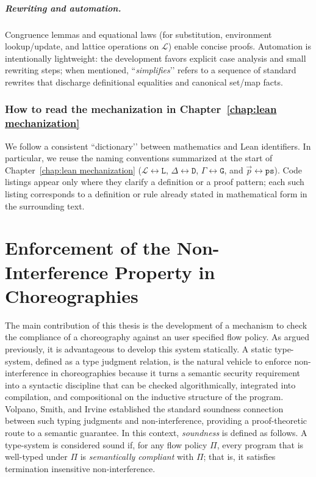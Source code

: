 \documentclass[12pt,a4paper,twoside]{book}
\newcommand{\MCL}{\mathscr{L}}
\begin{document}
\paragraph{Rewriting and automation.}
Congruence lemmas and equational laws (for substitution, environment lookup/update, and lattice operations on \(\MCL\)) enable concise proofs.
Automation is intentionally lightweight: the development favors explicit case analysis and small rewriting steps; when mentioned, ``\emph{simplifies}’’ refers to a sequence of standard rewrites that discharge definitional equalities and canonical set/map facts.

\subsection{How to read the mechanization in Chapter~\ref{chap:lean mechanization}}
We follow a consistent “dictionary’’ between mathematics and Lean identifiers.
In particular, we reuse the naming conventions summarized at the start of Chapter~\ref{chap:lean mechanization} (\(\MCL \leftrightarrow \texttt{L}\), \(\Delta \leftrightarrow \texttt{D}\), \(\Gamma \leftrightarrow \texttt{G}\), and \(\vec{p} \leftrightarrow \texttt{ps}\)).
Code listings appear only where they clarify a definition or a proof pattern; each such listing corresponds to a definition or rule already stated in mathematical form in the surrounding text.


\chapter{Enforcement of the Non-Interference Property in Choreographies}
The main contribution of this thesis is the development of a mechanism to check the compliance of a choreography against an user specified flow policy.
As argued previously, it is advantageous to develop this system statically.
A static type-system, defined as a type judgment relation, is the natural vehicle to enforce non-interference in choreographies because it turns a semantic security requirement into a syntactic discipline that can be checked algorithmically, integrated into compilation, and compositional on the inductive structure of the program.
Volpano, Smith, and Irvine\cite{volpano1996sound} established the standard soundness connection between such typing judgments and non-interference, providing a proof-theoretic route to a semantic guarantee. In this context, \textit{soundness} is defined as follows.
A type-system is considered sound if, for any flow policy $\Pi$, every program that is well-typed under $\Pi$ is \textit{semantically compliant} with $\Pi$; that is, it satisfies termination insensitive non-interference.
\end{document}
